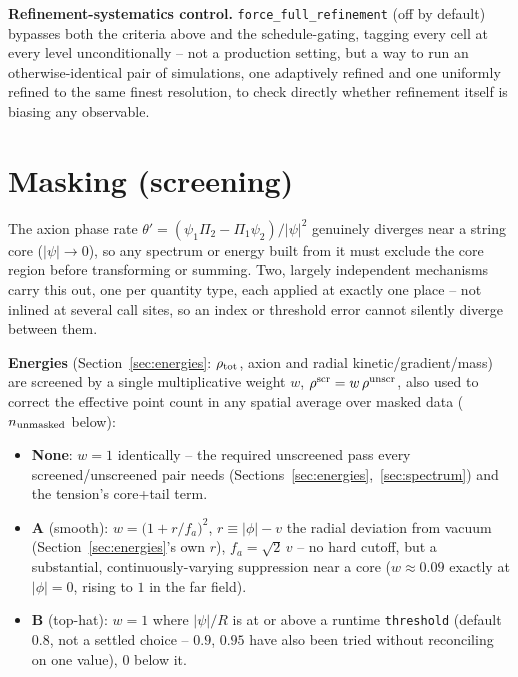\documentclass[11pt]{article}
\newcommand{\psivec}{\psi}
\begin{document}
\textbf{Refinement-systematics control.} \texttt{force\_full\_refinement} (off by default) bypasses both
the criteria above and the schedule-gating, tagging every cell at every level unconditionally -- not a
production setting, but a way to run an otherwise-identical pair of simulations, one adaptively refined and
one uniformly refined to the same finest resolution, to check directly whether refinement itself is biasing
any observable.

\section{Masking (screening)}
\label{sec:masking}
The axion phase rate $\theta' = (\psivec_1\Pi_2-\Pi_1\psivec_2)/|\psivec|^2$ genuinely diverges near a string
core ($|\psivec|\to0$), so any spectrum or energy built from it must exclude the core region before
transforming or summing. Two, largely independent mechanisms carry this out, one per quantity type,
each applied at exactly one place -- not inlined at several call sites, so an index or threshold error
cannot silently diverge between them.

\textbf{Energies} (Section~\ref{sec:energies}: $\rho_{\rm tot}$, axion and radial kinetic/gradient/mass) are
screened by a single multiplicative weight $w$, $\rho^{\rm scr}=w\,\rho^{\rm unscr}$, also used to correct
the effective point count in any spatial average over masked data ($n_{\rm unmasked}$ below):
\begin{itemize}
  \item \textbf{None}: $w=1$ identically -- the required unscreened pass every screened/unscreened pair
        needs (Sections~\ref{sec:energies},~\ref{sec:spectrum}) and the tension's core+tail term.
  \item \textbf{A} (smooth): $w = \big(1+r/f_a\big)^2$, $r\equiv|\phi|-v$ the radial deviation from vacuum
        (Section~\ref{sec:energies}'s own $r$), $f_a=\sqrt2\,v$ -- no hard cutoff, but a substantial,
        continuously-varying suppression near a core ($w\approx0.09$ exactly at $|\phi|=0$, rising to $1$ in
        the far field).
  \item \textbf{B} (top-hat): $w=1$ where $|\psivec|/R$ is at or above a runtime \texttt{threshold} (default
        $0.8$, not a settled choice -- $0.9$, $0.95$ have also been tried without reconciling on one value),
        $0$ below it.
\end{itemize}
\end{document}
